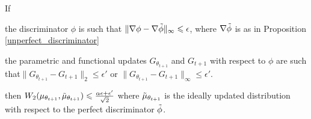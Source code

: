 \documentclass[runningheads]{llncs}
\begin{document}
\begin{corollary}
\normalfont
\label{total deviation}
If
\begin{inlinelist}
    \item the discriminator $\phi$ is such that $\|\nabla \phi - \nabla \Tilde{\phi}\|_{\infty}\leqslant \epsilon$, where $\nabla \Tilde{\phi}$ is as in Proposition \ref{unperfect_discriminator}
    \item the parametric and functional updates $G_{\theta_{t+1}}$ and $G_{t+1}$ with respect to $\phi$ are such that$\|G_{\theta_{t+1}}-G_{t+1}\|_2\leqslant \epsilon'$ or $\|G_{\theta_{t+1}}-G_{t+1}\|_\infty\leqslant \epsilon'$. 
\end{inlinelist}
then $W_2(\mu_{\theta_{t+1}},\Tilde{\mu}_{\theta_{t+1}})\leqslant \frac{\alpha\epsilon+\epsilon'}{\sqrt{2}}$ where $\Tilde{\mu}_{\theta_{t+1}}$ is the ideally updated distribution with respect to the perfect discriminator $\Tilde{\phi}$. %
\end{corollary}
\end{document}
